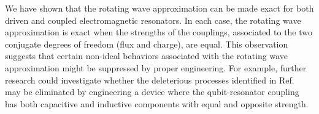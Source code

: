 
We have shown that the rotating wave approximation can be made exact for both driven and coupled electromagnetic resonators.
In each case, the rotating wave approximation is exact when the strengths of the couplings, associated to the two conjugate degrees of freedom (flux and charge), are equal.
This observation suggests that certain non-ideal behaviors associated with the rotating wave approximation might be suppressed by proper engineering.
For example, further research could investigate whether the deleterious processes identified in Ref.~\cite{Sank:rotating_wave:2016} may be eliminated by engineering a device where the qubit-resonator coupling has both capacitive and inductive components with equal and opposite strength.
